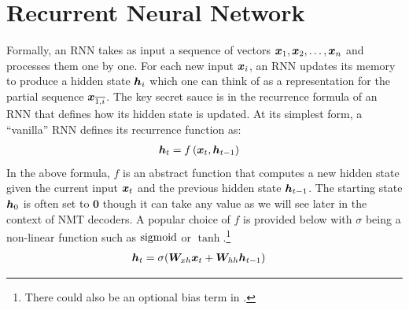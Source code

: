 \section{Recurrent Neural Network}
\label{sec:rnn}
Formally, an RNN takes as input a sequence of vectors $\bm{x}_{1},
\bm{x}_{2}, \ldots, \bm{x}_{n}$ and processes them one by one. For each
new input $\bm{x}_{i}$, an RNN updates its memory to produce a hidden state
$\bm{h}_{i}$ which one can think of as a representation for the partial sequence
$\bm{x}_{\overline{1,i}}$. %
The key secret sauce is in the
recurrence formula of an RNN that defines how its hidden state is updated. At
its simplest form, a ``vanilla'' RNN defines its recurrence function as:
\begin{align}
\bm{h}_{t} &= f\left(\bm{x}_{t}, \bm{h}_{t-1}\right) \label{e:abstract_rnn}
\end{align}
In the above formula, $f$ is an abstract function that computes a new hidden state given the current input $\bm{x}_{t}$ and the
previous hidden state $\bm{h}_{t-1}$. The starting state $\bm{h}_{0}$ is often set to
$\bm{0}$ though it can take any value as we will see later in the context
of NMT decoders. A popular choice of $f$ is provided below with $\sigma$ being a
non-linear function such as $\operatorname{sigmoid}$ or $\tanh$.\footnote{There could also be
an optional bias term in .}
\begin{align}
\hid{t} &= \sigma(\W{xh}\x{t} + \W{hh}\hid{t-1} \label{e:vanilla_rnn}) %
\end{align}

